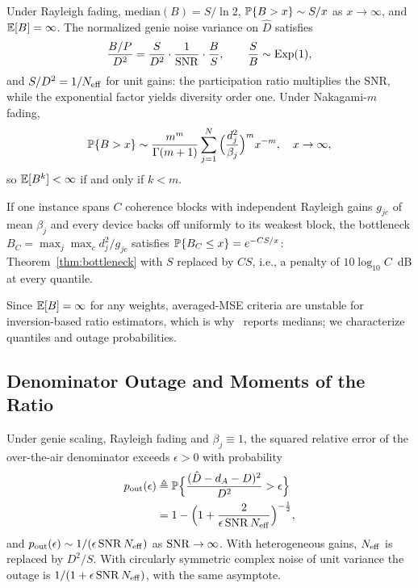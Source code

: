 \begin{corollary}\label{cor:tail}
Under Rayleigh fading, $\mathrm{median}(B)=S/\ln2$, $\mathbb{P}\{B>x\}\sim S/x$ as $x\to\infty$, and $\mathbb{E}[B]=\infty$. The normalized genie noise variance on $\hat D$ satisfies
\begin{equation}
\frac{B/P}{D^2}=\frac{S}{D^2}\cdot\frac{1}{\mathrm{SNR}}\cdot\frac{B}{S},\qquad \frac{S}{B}\sim\mathrm{Exp}(1),
\label{eq:effective_snr}
\end{equation}
and $S/D^2=1/N_{\mathrm{eff}}$ for unit gains: the participation ratio multiplies the SNR, while the exponential factor yields diversity order one. Under Nakagami-$m$ fading,
\begin{equation}
\mathbb{P}\{B>x\}\sim\frac{m^m}{\Gamma(m+1)}\sum_{j=1}^N\Big(\frac{d_j^2}{\beta_j}\Big)^m x^{-m},\quad x\to\infty,
\label{eq:tail_m}
\end{equation}
so $\mathbb{E}[B^k]<\infty$ if and only if $k<m$.
\end{corollary}

\begin{corollary}\label{cor:coherence}
If one instance spans $C$ coherence blocks with independent Rayleigh gains $g_{jc}$ of mean $\beta_j$ and every device backs off uniformly to its weakest block, the bottleneck $B_C=\max_j\max_cd_j^2/g_{jc}$ satisfies $\mathbb{P}\{B_C\le x\}=e^{-CS/x}$: Theorem~\ref{thm:bottleneck} with $S$ replaced by $CS$, i.e., a penalty of $10\log_{10}C$~dB at every quantile.
\end{corollary}

Since $\mathbb{E}[B]=\infty$ for any weights, averaged-MSE criteria are unstable for inversion-based ratio estimators, which is why~\cite{sato2026awa} reports medians; we characterize quantiles and outage probabilities.

\subsection{Denominator Outage and Moments of the Ratio}

\begin{theorem}\label{thm:outage}
Under genie scaling, Rayleigh fading and $\beta_j\equiv1$, the squared relative error of the over-the-air denominator exceeds $\epsilon>0$ with probability
\begin{equation}
\begin{aligned}
p_{\rm out}(\epsilon)&\triangleq\mathbb{P}\Big\{\frac{(\hat D-d_A-D)^2}{D^2}>\epsilon\Big\}\\
&=1-\Big(1+\frac{2}{\epsilon\,\mathrm{SNR}\,N_{\mathrm{eff}}}\Big)^{-\frac12},
\end{aligned}
\label{eq:outage}
\end{equation}
and $p_{\rm out}(\epsilon)\sim1/(\epsilon\,\mathrm{SNR}\,N_{\mathrm{eff}})$ as $\mathrm{SNR}\to\infty$. With heterogeneous gains, $N_{\mathrm{eff}}$ is replaced by $D^2/S$. With circularly symmetric complex noise of unit variance the outage is $1/(1+\epsilon\,\mathrm{SNR}\,N_{\mathrm{eff}})$, with the same asymptote.
\end{theorem}

